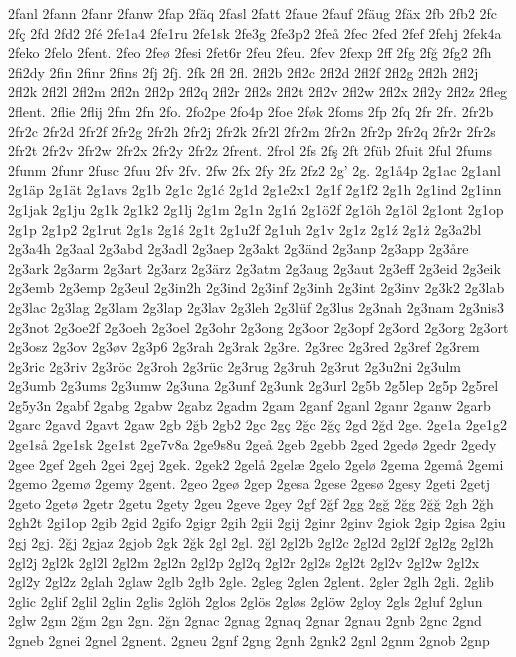 2fanl
2fann
2fanr
2fanw
2fap
2fäq
2fasl
2fatt
2faue
2fauf
2fäug
2fäx
2fb
2fb2
2fc
2fç
2fd
2fd2
2fé
2fe1a4
2fe1ru
2fe1sk
2fe3g
2fe3p2
2feå
2fec
2fed
2fef
2fehj
2fek4a
2feko
2felo
2fent.
2feo
2feø
2fesi
2fet6r
2feu
2feu.
2fev
2fexp
2ff
2fg
2fğ
2fg2
2fh
2fi2dy
2fin
2finr
2fins
2fj
2fj.
2fk
2fl
2fl.
2fl2b
2fl2c
2fl2d
2fl2f
2fl2g
2fl2h
2fl2j
2fl2k
2fl2l
2fl2m
2fl2n
2fl2p
2fl2q
2fl2r
2fl2s
2fl2t
2fl2v
2fl2w
2fl2x
2fl2y
2fl2z
2fleg
2flent.
2flie
2flij
2fm
2fn
2fo.
2fo2pe
2fo4p
2foe
2føk
2foms
2fp
2fq
2fr
2fr.
2fr2b
2fr2c
2fr2d
2fr2f
2fr2g
2fr2h
2fr2j
2fr2k
2fr2l
2fr2m
2fr2n
2fr2p
2fr2q
2fr2r
2fr2s
2fr2t
2fr2v
2fr2w
2fr2x
2fr2y
2fr2z
2frent.
2frol
2fs
2fş
2ft
2füb
2fuit
2ful
2fums
2funm
2funr
2fusc
2fuu
2fv
2fv.
2fw
2fx
2fy
2fz
2fz2
2g'
2g.
2g1å4p
2g1ac
2g1anl
2g1äp
2g1ät
2g1avs
2g1b
2g1c
2g1ć
2g1d
2g1e2x1
2g1f
2g1f2
2g1h
2g1ind
2g1inn
2g1jak
2g1ju
2g1k
2g1k2
2g1lj
2g1m
2g1n
2g1ń
2g1ö2f
2g1öh
2g1öl
2g1ont
2g1op
2g1p
2g1p2
2g1rut
2g1s
2g1ś
2g1t
2g1u2f
2g1uh
2g1v
2g1z
2g1ź
2g1ż
2g3a2bl
2g3a4h
2g3aal
2g3abd
2g3adl
2g3aep
2g3akt
2g3änd
2g3anp
2g3app
2g3åre
2g3ark
2g3arm
2g3art
2g3arz
2g3ärz
2g3atm
2g3aug
2g3aut
2g3eff
2g3eid
2g3eik
2g3emb
2g3emp
2g3eul
2g3in2h
2g3ind
2g3inf
2g3inh
2g3int
2g3inv
2g3k2
2g3lab
2g3lac
2g3lag
2g3lam
2g3lap
2g3lav
2g3leh
2g3lüf
2g3lus
2g3nah
2g3nam
2g3nis3
2g3not
2g3oe2f
2g3oeh
2g3oel
2g3ohr
2g3ong
2g3oor
2g3opf
2g3ord
2g3org
2g3ort
2g3osz
2g3ov
2g3øv
2g3p6
2g3rah
2g3rak
2g3re.
2g3rec
2g3red
2g3ref
2g3rem
2g3ric
2g3riv
2g3röc
2g3roh
2g3rüc
2g3rug
2g3ruh
2g3rut
2g3u2ni
2g3ulm
2g3umb
2g3ums
2g3umw
2g3una
2g3unf
2g3unk
2g3url
2g5b
2g5lep
2g5p
2g5rel
2g5y3n
2gabf
2gabg
2gabw
2gabz
2gadm
2gam
2ganf
2ganl
2ganr
2ganw
2garb
2garc
2gavd
2gavt
2gaw
2gb
2ğb
2gb2
2gc
2gç
2ğc
2ğç
2gd
2ğd
2ge.
2ge1a
2ge1g2
2ge1så
2ge1sk
2ge1st
2ge7v8a
2ge9s8u
2geå
2geb
2gebb
2ged
2gedø
2gedr
2gedy
2gee
2gef
2geh
2gei
2gej
2gek.
2gek2
2gelå
2gelæ
2gelo
2gelø
2gema
2gemå
2gemi
2gemo
2gemø
2gemy
2gent.
2geo
2geø
2gep
2gesa
2gese
2gesø
2gesy
2geti
2getj
2geto
2getø
2getr
2getu
2gety
2geu
2geve
2gey
2gf
2ğf
2gg
2gğ
2ğg
2ğğ
2gh
2ğh
2gh2t
2gi1op
2gib
2gid
2gifo
2gigr
2gih
2gii
2gij
2ginr
2ginv
2giok
2gip
2gisa
2giu
2gj
2gj.
2ğj
2gjaz
2gjob
2gk
2ğk
2gl
2gl.
2ğl
2gl2b
2gl2c
2gl2d
2gl2f
2gl2g
2gl2h
2gl2j
2gl2k
2gl2l
2gl2m
2gl2n
2gl2p
2gl2q
2gl2r
2gl2s
2gl2t
2gl2v
2gl2w
2gl2x
2gl2y
2gl2z
2glah
2glaw
2glb
2głb
2gle.
2gleg
2glen
2glent.
2gler
2glh
2gli.
2glib
2glic
2glif
2glil
2glin
2glis
2glöh
2glos
2glös
2gløs
2glöw
2gloy
2gls
2gluf
2glun
2glw
2gm
2ğm
2gn
2gn.
2ğn
2gnac
2gnag
2gnaq
2gnar
2gnau
2gnb
2gnc
2gnd
2gneb
2gnei
2gnel
2gnent.
2gneu
2gnf
2gng
2gnh
2gnk2
2gnl
2gnm
2gnob
2gnp
